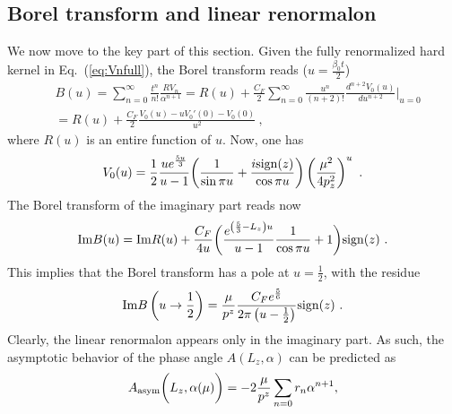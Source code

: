 \documentclass[a4paper,11pt]{article}
\begin{document}
\subsection{Borel transform and linear renormalon}
We now move to the key part of this section. Given the fully renormalized hard kernel in Eq.~(\ref{eq:Vnfull}), the Borel transform reads ($u=\frac{\beta_0t}{2}$)
\begin{align}\label{eq:BorelHLfull}
&B(u)=\sum_{n=0}^{\infty}\frac{t^n}{n!} \frac{RV_n}{\alpha^{n+1}}= R(u)+\frac{C_F}{2}\sum_{n=0}^{\infty}\frac{u^n}{(n+2)!}\frac{d^{n+2}V_0(u)}{du^{n+2}}|_{u=0}\nonumber \\
&=R(u)+\frac{C_F}{2}\frac{V_0(u)-uV_0'(0)-V_0(0)}{u^2} \ ,
\end{align}
where $R(u)$ is an entire function of $u$. Now, one has
\begin{align}\label{eq:BorelHLexp}
V_0(u)=\frac{1}{2}\frac{ue^{\frac{5u}{3}}}{u-1}\bigg(\frac{1}{\sin \pi u}+\frac{i{\rm sign}(z)}{\cos \pi u}\bigg)\left(\frac{\mu^2}{4p_z^2}\right)^u \ .
\end{align}
The Borel transform of the imaginary part reads now
\begin{align}
{\rm Im} B(u)={\rm Im} R(u)+\frac{C_F}{4 u}\bigg(\frac{e^{\left(\frac{5}{3}-L_z\right)u}}{u-1}\frac{1}{\cos \pi u}+1\bigg){\rm sign}(z) \ .
\end{align}
This implies that the Borel transform has a pole at $u=\frac{1}{2}$, with the residue 
\begin{align}\label{eq:Borel}
{\rm Im } B\left(u\rightarrow \frac{1}{2}\right)=\frac{\mu}{p^z}\frac{C_Fe^{\frac{5}{6}}}{2\pi \left(u-\frac{1}{2}\right)}{\rm sign}(z) \ .
\end{align}
Clearly, the linear renormalon appears only in the imaginary part.  As such, the asymptotic behavior of the phase angle $A(L_z,\alpha)$ can be predicted as
\begin{align}
A_{\rm asym}\bigg(L_z,\alpha(\mu)\bigg) = -2\frac{\mu}{p^z} \sum_{n=0} r_{n} \alpha^{n+1},
\end{align}
\end{document}
